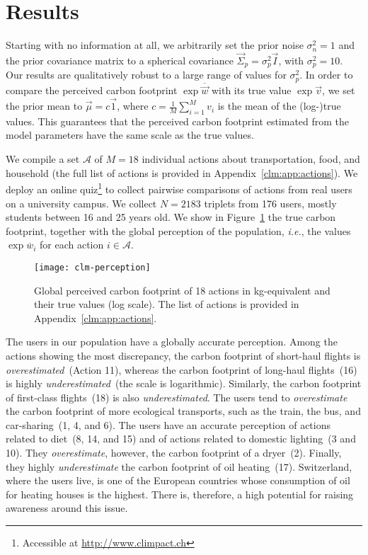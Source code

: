 \section{Results}
\label{clm:sec:results}

Starting with no information at all, we arbitrarily set the prior noise $\sigma_n^{2} = 1$ and the prior covariance matrix to a spherical covariance $\vec{\Sigma}_p = \sigma_p^{2} \vec{I}$, with $\sigma_p^{2} = 10$.
Our results are qualitatively robust to a large range of values for $\sigma_p^{2}$.
In order to compare the perceived carbon footprint $\exp \overline{\vec{w}}$ with its true value $\exp \vec{v}$, we set the prior mean to $\vec{\mu} = c \vec{1}$, where $ c = \frac{1}{M}\sum_{i=1}^M v_i$ is the mean of the (log-)true values.
This guarantees that the perceived carbon footprint estimated from the model parameters have the same scale as the true values.

We compile a set $\mathcal{A}$ of $M=18$ individual actions about transportation, food, and household (the full list of actions is provided in Appendix~\ref{clm:app:actions}).
We deploy an online quiz\footnote{Accessible at \url{http://www.climpact.ch}} to collect pairwise comparisons of actions from real users on a university campus.
We collect $N=2183$ triplets from 176 users, mostly students between 16 and 25 years old.
We show in Figure~\ref{clm:fig:perception} the true carbon footprint, together with the global perception of the population, \textit{i.e.}, the values $\exp \overline{w}_i$ for each action $i \in \mathcal{A}$.

\begin{figure}
	\centering
	\texttt{[image: clm-perception]}
	\caption{Global perceived carbon footprint of 18 actions in kg\COtwo-equivalent and their true values (log scale).
		The list of actions is provided in Appendix~\ref{clm:app:actions}.}%
	\label{clm:fig:perception}
\end{figure}

The users in our population have a globally accurate perception.
Among the actions showing the most discrepancy, the carbon footprint of short-haul flights is \textit{overestimated}~(Action 11), whereas the carbon footprint of long-haul flights~(16) is highly \textit{underestimated}~(the scale is logarithmic).
Similarly, the carbon footprint of first-class flights~(18) is also \textit{underestimated}.
The users tend to \textit{overestimate} the carbon footprint of more ecological transports, such as the train, the bus, and car-sharing~(1, 4, and 6).
The users have an accurate perception of actions related to diet~(8, 14, and 15) and of actions related to domestic lighting~(3 and 10).
They \textit{overestimate}, however, the carbon footprint of a dryer~(2).
Finally, they highly \textit{underestimate} the carbon footprint of oil heating~(17).
Switzerland, where the users live, is one of the European countries whose consumption of oil for heating houses is the highest.
There is, therefore, a high potential for raising awareness around this issue.
